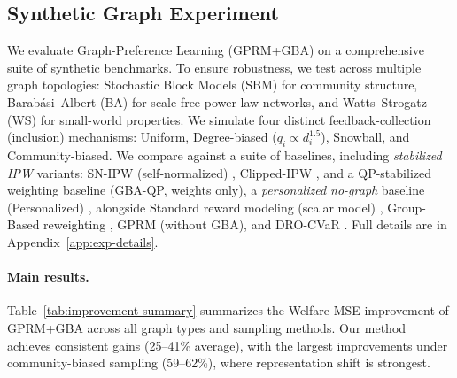 \documentclass{article}
\theoremstyle{plain}
\theoremstyle{definition}
\theoremstyle{remark}
\begin{document}
\subsection{Synthetic Graph Experiment}
\label{subsec:exp-synthetic}

We evaluate Graph-Preference Learning (GPRM+GBA) on a comprehensive
suite of synthetic benchmarks. To ensure robustness, we test across multiple
graph topologies: Stochastic Block Models (SBM) for community structure,
Barabási--Albert (BA) for scale-free power-law networks, and Watts--Strogatz
(WS) for small-world properties.
We simulate four distinct feedback-collection (inclusion) mechanisms: Uniform,
Degree-biased ($q_i \propto d_i^{1.5}$), Snowball, and Community-biased. We
compare against a suite of baselines, including \emph{stabilized IPW} variants:
SN-IPW (self-normalized) \citep{chandak2021uno}, Clipped-IPW \citep{chandak2021uno}, and a QP-stabilized weighting baseline
(GBA-QP, weights only)\citep {hainmueller2012entropy}, a \emph{personalized no-graph} baseline (Personalized) \citep{li2024personalized_rlhf},
alongside Standard reward modeling (scalar model) \citep{stiennon2020summarize,ouyang2022instructgpt},
Group-Based reweighting \citep{chakraborty2024maxminrlhf,ramesh2024grpo}, GPRM (without GBA), and DRO-CVaR \citep{rahimian2022dro}. Full details are in
Appendix~\ref{app:exp-details}.

\paragraph{Main results.}
Table~\ref{tab:improvement-summary} summarizes the Welfare-MSE improvement of GPRM+GBA across all graph types and sampling methods. Our method achieves consistent gains (25--41\% average), with the largest improvements under community-biased sampling (59--62\%), where representation shift is strongest.
\end{document}
